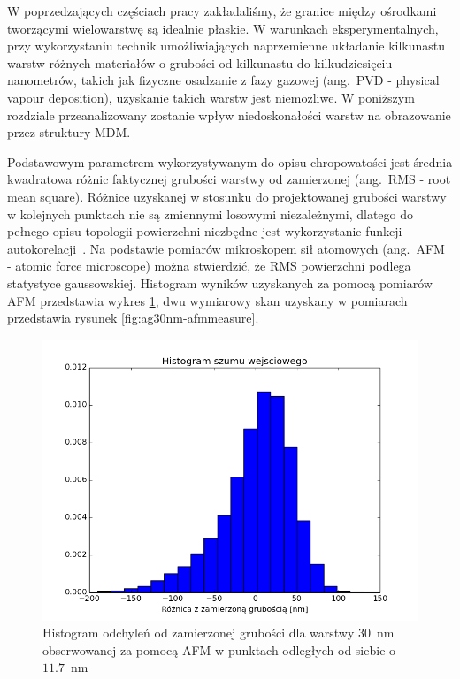 W poprzedzających częściach pracy zakładaliśmy, że granice między ośrodkami tworzącymi wielowarstwę są idealnie płaskie. W warunkach eksperymentalnych, przy wykorzystaniu technik umożliwiających naprzemienne układanie kilkunastu warstw różnych materiałów o grubości od kilkunastu do kilkudziesięciu nanometrów,  takich jak fizyczne osadzanie z fazy gazowej (ang.~PVD - physical vapour deposition), uzyskanie takich warstw jest niemożliwe. W poniższym rozdziale przeanalizowany zostanie wpływ niedoskonałości warstw na obrazowanie przez struktury MDM.

Podstawowym parametrem wykorzystywanym do opisu chropowatości jest średnia kwadratowa różnic faktycznej grubości warstwy od zamierzonej (ang.~RMS - root mean square). Różnice uzyskanej w stosunku do projektowanej grubości warstwy w kolejnych punktach nie są zmiennymi losowymi niezależnymi, dlatego do pełnego opisu topologii powierzchni niezbędne jest wykorzystanie funkcji autokorelacji~\cite{stefaniuk2011effect}. Na podstawie pomiarów mikroskopem sił atomowych (ang.~AFM - atomic force microscope) można stwierdzić, że RMS powierzchni podlega statystyce gaussowskiej. Histogram wyników uzyskanych za pomocą pomiarów AFM przedstawia wykres \ref{fig:ag30nm-afmhist}, dwu wymiarowy skan uzyskany w pomiarach przedstawia rysunek \ref{fig:ag30nm-afmmeasure}.

\begin{figure}[bt]
		\includegraphics[width=\textwidth]{images/multilayer/ag30nm-afm-measure-hist.png}
		\caption{Histogram odchyleń od zamierzonej grubości dla warstwy $30$~nm obserwowanej za pomocą AFM w punktach odległych od siebie o $11.7$~nm} 		\label{fig:ag30nm-afmhist}
\end{figure}

